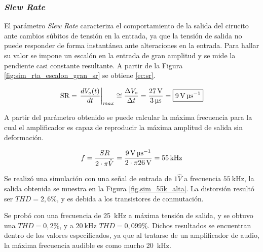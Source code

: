 \subsubsection{\textit{Slew Rate}}



	El parámetro \textit{Slew Rate} caracteriza el comportamiento de la salida del cirucito ante cambios súbitos de tensión en la entrada, ya que la tensión de salida no puede responder de forma instantánea ante alteraciones en la entrada. Para hallar su valor se impone un escalón en la entrada de gran amplitud y se mide la pendiente casi constante resultante. A partir de la Figura \ref{fig:sim_rta_escalon_gran_sr} se obtiene \eqref{ec:sr}.

	\begin{equation}
	\centering
	\mathrm{SR} = \left. \frac{dV_o(t)}{dt} \right\rvert_{max} \cong \frac{\Delta V_o}{\Delta t} = \frac{\SI{27}{\volt}}{\SI{3}{\micro\second}} = \boxed{\SI{9}{\volt\per\micro\second}}
	\label{ec:sr}
\end{equation}


A partir del parámetro obtenido se puede calcular la máxima frecuencia para la cual el amplificador es capaz de reproducir la máxima amplitud de salida sin deformación.

\begin{equation}
	\centering
	f = \frac{SR}{2 \cdot \pi \hat{V} } = \frac{\SI{9}{\volt\per\micro\second}}{2 \cdot \pi \SI{26}{\volt}} = \SI{55}{\kilo\hertz}
	\label{ec.max_f}
\end{equation}

Se realizó una simulación con una señal de entrada de $1 \hat{V}$ a frecuencia $\SI{55}{\kilo\hertz}$, la salida obtenida se muestra en la Figura \ref{fig.sim_55k_alta}. La distorsión resultó ser $THD = 2,6\%$, y es debida a los transistores de conmutación. 


Se probó con una frecuencia de \SI{25}{\kilo\hertz} a máxima tensión de salida, y se obtuvo una $THD=0,2\%$, y a $\SI{20}{\kilo\hertz}$ $THD=0,099\%$. Dichos resultados se encuentran dentro de los valores especificados, ya que al tratarse de un amplificador de audio, la máxima frecuencia audible es como mucho \SI{20}{\kilo\hertz}.

